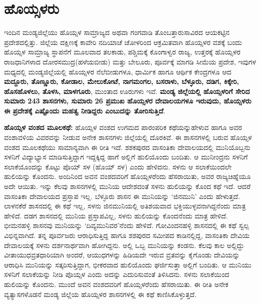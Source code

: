 \section{ಹೊಯ್ಸಳರು}

ಇಂದಿನ ಮಂಡ್ಯಜಿಲ್ಲೆಯು ಹೊಯ್ಸಳ ಸಾಮ್ರಾಜ್ಯದ ಅಥವಾ ಗಂಗವಾಡಿ ತೊಂಬತ್ತಾರುಸಾವಿರದ ಆಯಕಟ್ಟಿನ ಪ್ರದೇಶದಲ್ಲಿತ್ತು. ಜಿಲ್ಲೆಯ ದಕ್ಷಿಣಕ್ಕೆ ಕಾವೇರಿ ನದಿಯಾಚೆ ಚೋಳರಿಂದ ಆಕ್ರಮಿತವಾಗಿ ಹೊಯ್ಸಳರ ವಶಕ್ಕೆ ಬಂದು ಹೊಯ್ಸಳ ಸಾಮ್ರಾಜ್ಯ ಸ್ಥಾಪನೆಗೆ ಮೂಲವಾದ ತಲಕಾಡು, ಪಶ್ಚಿಮಕ್ಕೆ ಕೊಂಗಾಳ್ವರ ರಾಜ್ಯ, ಉತ್ತರಕ್ಕೆ ಹೊಯ್ಸಳರ ರಾಜಧಾನಿಗಳಾದ ದೋರಸಮುದ್ರ\break (ಹಳೆಯಬೀಡು) ಮತ್ತು ಬೇಲೂರು, ಪೂರ್ವಕ್ಕೆ ಮಾಗಡಿ ಸೀಮೆಯ ಪ್ರದೇಶ, ಇವುಗಳ ಮಧ್ಯದಲ್ಲಿ ಮಂಡ್ಯಜಿಲ್ಲೆಯಲ್ಲಿ ಹೊಯ್ಸಳರ ನೆಲೆಬೀಡುಗಳೂ, ಧಾರ್ಮಿಕ ಹಾಗೂ ಆರ್ಥಿಕ ಕೇಂದ್ರಗಳೂ ಆದ \textbf{ಮದ್ದೂರು, ತೊಣ್ಣೂರು, ಕೋಡಾಲ, ಮೇಲುಕೋಟೆ, ನಾಗಮಂಗಲ, ಬಸರಾಳು, ಬೆಳ್ಳೂರು, ದಡಿಗ, ಕಿಕ್ಕೇರಿ, ಹೊಸಹೊಳಲು, ತೊಳಸಿ, ಮಾಳಗೂರು}, ಮುಂತಾದ ಊರುಗಳು ಇವೆ. \textbf{ಮಂಡ್ಯ ಜಿಲ್ಲೆಯಲ್ಲಿ ಹೊಯ್ಸಳರಿಗೆ ಸೇರಿದ ಸುಮಾರು 243 ಶಾಸನಗಳು, ಸುಮಾರು 26 ಪ್ರಮುಖ ಹೊಯ್ಸಳರ ದೇವಾಲಯಗಳೂ ಇರುವುದು, ಹೊಯ್ಸಳರು ಈ ಪ್ರದೇಶಕ್ಕೆ ಎಷ್ಟೊಂದು ಮಹತ್ವ ನೀಡಿದ್ದರು ಎಂಬುದನ್ನು ತೋರಿಸುತ್ತಿದೆ}.

\textbf{ಹೊಯ್ಸಳ ವಂಶದ ಮೂಲಕಥೆ: } ಹೊಯ್ಸಳ ವಂಶದ ಉಗಮದ ಪಾರಂಪರಿಕ ಕಥೆಯನ್ನುಹೇಳುವ ಹಾಗೂ ಅವರ ವಂಶಾವಳಿಯ ವಿವರವನ್ನು ನೀಡುವ ಅನೇಕ ಶಾಸನಗಳು ಜಿಲ್ಲೆಯಲ್ಲಿ ದೊರಕಿವೆ. ಈ ಶಾಸನಗಳಲ್ಲಿ ಬರುವ ಹೊಯ್ಸಳ ವಂಶದ ಮೂಲಕಥೆಯು ಸಾಮಾನ್ಯವಾಗಿ ಈ ರೀತಿ ಇದೆ. ಶಶಕಪುರದ ವಾಸಂತಿಕಾ ದೇವಾಲಯದಲ್ಲಿ ಮುನಿಯೊಬ್ಬನು ಸಳನಿಗೆ ವಿದ್ಯಾಭ್ಯಾಸ ಮಾಡಿಸುತ್ತಿದ್ದಾಗ ಇದ್ದಕ್ಕಿದ್ದ ಹಾಗೆ ಅಲ್ಲಿಗೆ ಹುಲಿಯೊಂದು ಬಂದಿತು. ಆ ಮುನೀಂದ್ರನು ಸಳನಿಗೆ ಸಲಾಕೆಯೊಂದನ್ನು ಕೊಟ್ಟು ಪೊಯ್​ ಸಳ (ಹೊಯ್​ ಸಳ) ಎಂದು ಹೇಳಿದನು. ಸಳನು ಆ ಸಲಾಕೆಯಿಂದಲೇ ಹುಲಿಯನ್ನು ಕೊಂದನು. ಅಂದಿನಿಂದ ಅವನ ವಂಶದವರಿಗೆ ಹೊಯ್ಸಳರೆಂದು ಹೆಸರಾಯಿತು, ಅವರ ರಾಜ್ಯಚಿಹ್ನೆಯೂ ಅದೇ ಆಯಿತು. ಇನ್ನು ಕೆಲವು ಶಾಸನಗಳಲ್ಲಿ ಮುನಿಯ ಆದೇಶದಂತೆ ಸಳನು ಹುಲಿಯನ್ನು ಕೊಂದ ಕಥೆ ಇದೆ. ಆದರೆ ವಾಸಂತಿಕಾ ದೇವಾಲಯದ ಪ್ರಸ್ತಾಪ ಇಲ್ಲ. ಬೆಳ್ಳೂರು ಶಾಸನ ಈ ಮುನಿಯನ್ನು ‘ಜಿನಮುನಿ’ ಎಂದು ಹೇಳುತ್ತದೆ. ಲಾಳನಕೆರೆ ಶಾಸನದಲ್ಲಿ ಈ ಕಥೆ ಇಲ್ಲ, ಸಳನು ಜಿನಮುನಿಯಲ್ಲಿ ಅತಿಶಯವಾದ ಭಕ್ತಿಯುಳ್ಳವನಾಗಿದ್ದನೆಂದು ಮಾತ್ರ ಹೇಳಿದೆ. ದಡಗ ಶಾಸನದಲ್ಲಿ ಮುನಿಯ ಪ್ರಸ್ತಾಪವಿಲ್ಲ, ಸಳನು ಹುಲಿಯನ್ನು ಕೊಂದನೆಂದು ಮಾತ್ರ ಹೇಳಿದೆ. ಭೀಮನಹಳ್ಳಿ ಶಾಸನವು ಮುನಿಯನ್ನು ‘ದಿವ್ಯಮುನಿವರ’ನೆಂದು ಹೇಳಿದೆ. ಗೋವಿಂದನಹಳ್ಳಿ ಶಾಸನದಲ್ಲಿ ಈ ಕಥೆ ಸ್ವಲ್ಪ ವಿಭಿನ್ನವಾಗಿದೆ. ತನ್ನ ಪೂರ್ವಜರು ಆರಾಧಿಸುತ್ತಿದ್ದ ಹಾಗೂ ಶಶಪುರದ ಸಮೀಪದ ಕಾಡಿನಲ್ಲಿದ್ದ, ವಾಸಂತಿಕಾ ದೇವಿಯ ದೇವಾಲಯಕ್ಕೆ ಸಳನು ದರ್ಶನಾರ್ಥವಾಗಿ ಹೋಗಿದ್ದನು. ಅಲ್ಲಿ ಒಬ್ಬ ಮುನಿಯನ್ನು ಕಂಡನು. ಕೆಲವು ಕಾಲ ಅಲ್ಲಿದ್ದು ವೀತಾಯುಧವ್ರತಧಾರಿಯಾಗಿ ಅಂದರೆ, ಆಯುಧಗಳನ್ನು ಹಿಡಿಯದೇ ಇರುವ ವ್ರತವನ್ನು ಕೈಗೊಂಡು ದೇವಿಯನ್ನು ಆರಾಧಿಸಿ ಮುನಿಯನ್ನು ಸತ್ಕರಿಸುತ್ತಿದ್ದಾಗ, ಭೀಕರವಾದ ಹುಲಿಯೊಂದು ಘರ್ಜಿಸುತ್ತಾ ಅಲ್ಲಿಗೆ ಬಂದಿತು. ಆ ಮುನಿಯು ಸಳನಿಗೆ ಸಲಾಕೆಯನ್ನು ನೀಡಿ ಪೊಯ್ಸಳ ಎಂದು ಅದನ್ನು ಎದುರಿಸುವಂತೆ ತಿಳಿಸಿದನು. ಸಳನು ಸಲಾಕೆಯಿಂದ ಹುಲಿಯನ್ನು ಕೊಂದನು. ಮುಂದೆ ಅವನ ವಂಶದವರಿಗೆ ಹೊಯ್ಸಳರೆಂದು ಹೆಸರಾಯಿತು. ಈ ರೀತಿ ಅನೇಕ ವ್ಯತ್ಯಾಸಗಳೊಡನೆ ಮಂಡ್ಯ ಜಿಲ್ಲೆಯ ಹೊಯ್ಸಳರ ಶಾಸನಗಳಲ್ಲಿ ಈ ಕಥೆ ಕಾಣಿಸಿಕೊಳ್ಳುತ್ತದೆ.


